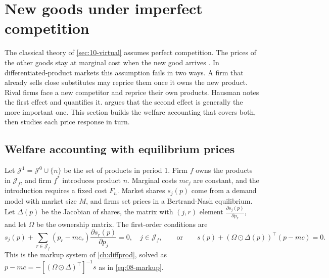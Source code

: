 \section{New goods under imperfect competition}\label{sec:10-imperfect}

The classical theory of \cref{sec:10-virtual} assumes perfect competition. The prices of the other goods stay
at marginal cost when the new good arrives \citep[p.~213]{Hausman1997}. In differentiated-product markets
this assumption fails in two ways. A firm that already sells close substitutes may reprice them once it owns
the new product. Rival firms face a new competitor and reprice their own products. Hausman notes the first
effect and quantifies it. \citet{Bresnahan1997} argues that the second effect is generally the more important
one. This section builds the welfare accounting that covers both, then studies each price response in turn.

\subsection{Welfare accounting with equilibrium prices}\label{sec:10-accounting}

Let $\mathcal{J}^1 = \mathcal{J}^0\cup\{n\}$ be the set of products in period 1. Firm $f$ owns the products in
$\mathcal{J}_f$, and firm $f^*$ introduces product $n$. Marginal costs $mc_j$ are constant, and the
introduction requires a fixed cost $F_n$. Market shares $s_j(p)$ come from a demand model with market size
$M$, and firms set prices in a Bertrand-Nash equilibrium. Let $\Delta(p)$ be the Jacobian of shares, the
matrix with $(j,r)$ element $\frac{\partial s_j(p)}{\partial p_r}$, and let $\Omega$ be the ownership matrix.
The first-order conditions are
\begin{equation}\label{eq:10-foc}
  s_j(p) + \sum_{r\in\mathcal{J}_f}(p_r - mc_r)\frac{\partial s_r(p)}{\partial p_j} = 0, \quad j\in\mathcal{J}_f,
  \qquad\text{or}\qquad s(p) + (\Omega\odot\Delta(p))^\top(p - mc) = 0 .
\end{equation}
This is the markup system of \cref{ch:diffprod}, solved as $p - mc = -[(\Omega\odot\Delta)^\top]^{-1}s$ as in
\eqref{eq:08-markup}.

